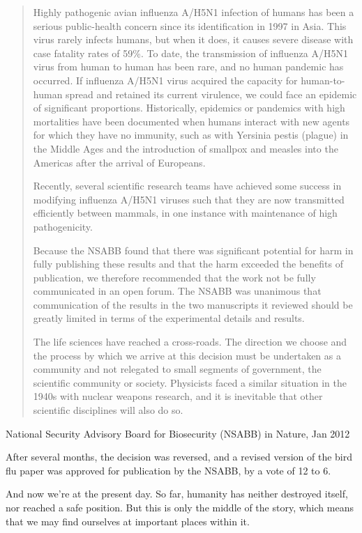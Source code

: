 \documentclass{article}
\begin{document}
\blockquote{Highly pathogenic avian influenza A/H5N1 infection of humans has been a serious
public-health concern since its identification in 1997 in Asia. This virus
rarely infects humans, but when it does, it causes severe disease with case
fatality rates of 59\%. To date, the transmission of influenza A/H5N1 virus from
human to human has been rare, and no human pandemic has occurred. If influenza
A/H5N1 virus acquired the capacity for human-to-human spread and retained its
current virulence, we could face an epidemic of significant proportions.
Historically, epidemics or pandemics with high mortalities have been documented
when humans interact with new agents for which they have no immunity, such as
with Yersinia pestis (plague) in the Middle Ages and the introduction of
smallpox and measles into the Americas after the arrival of Europeans.

Recently, several scientific research teams have achieved some success in
modifying influenza A/H5N1 viruses such that they are now transmitted
efficiently between mammals, in one instance with maintenance of high
pathogenicity.

Because the NSABB found that there was significant potential for harm in fully
publishing these results and that the harm exceeded the benefits of
publication, we therefore recommended that the work not be fully communicated
in an open forum. The NSABB was unanimous that communication of the results in
the two manuscripts it reviewed should be greatly limited in terms of the
experimental details and results.

The life sciences have reached a cross-roads. The direction we choose and the
process by which we arrive at this decision must be undertaken as a community
and not relegated to small segments of government, the scientific community or
society. Physicists faced a similar situation in the 1940s with nuclear weapons
research, and it is inevitable that other scientific disciplines will also do
so.}{National Security Advisory Board for Biosecurity (NSABB) in Nature, Jan 2012}

After several months, the decision was reversed, and a revised version of the
bird flu paper was approved for publication by the NSABB, by a vote of 12 to 6.


And now we're at the present day. So far, humanity has neither destroyed
itself, nor reached a safe position. But this is only the middle of the story,
which means that we may find ourselves at important places within it.
\end{document}

